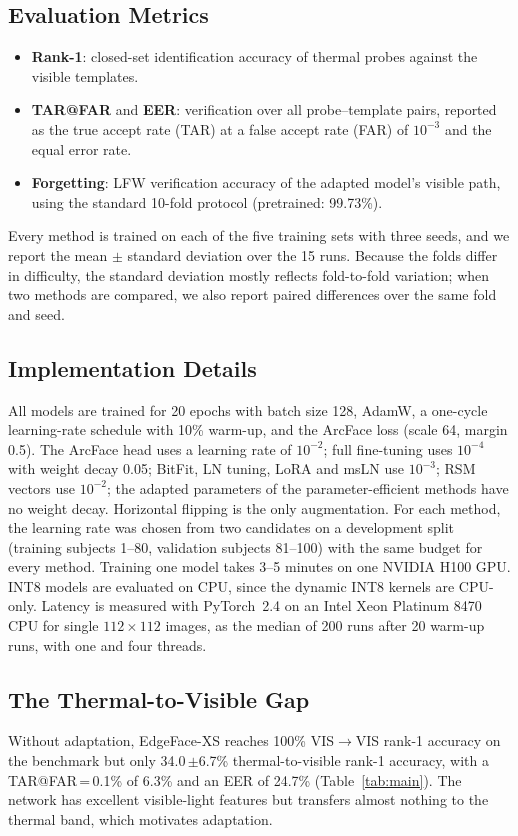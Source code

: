 \documentclass[journal]{IEEEtran}
\newcommand{\pmstd}[2]{#1\,{\scriptsize$\pm$#2}}
\begin{document}
\subsection{Evaluation Metrics}
\begin{itemize}
  \item \textbf{Rank-1}: closed-set identification accuracy of thermal probes against the visible templates.
  \item \textbf{TAR@FAR} and \textbf{EER}: verification over all probe--template pairs, reported as the true accept rate (TAR) at a false accept rate (FAR) of $10^{-3}$ and the equal error rate.
  \item \textbf{Forgetting}: LFW \cite{huang2007lfw} verification accuracy of the adapted model's visible path, using the standard 10-fold protocol (pretrained: 99.73\%).
\end{itemize}
Every method is trained on each of the five training sets with three seeds, and we report the mean $\pm$ standard deviation over the 15 runs. Because the folds differ in difficulty, the standard deviation mostly reflects fold-to-fold variation; when two methods are compared, we also report paired differences over the same fold and seed.

\subsection{Implementation Details}
All models are trained for 20 epochs with batch size 128, AdamW, a one-cycle learning-rate schedule with 10\% warm-up, and the ArcFace loss \cite{deng2019arcface} (scale 64, margin 0.5). The ArcFace head uses a learning rate of $10^{-2}$; full fine-tuning uses $10^{-4}$ with weight decay 0.05; BitFit, LN tuning, LoRA and msLN use $10^{-3}$; RSM vectors use $10^{-2}$; the adapted parameters of the parameter-efficient methods have no weight decay. Horizontal flipping is the only augmentation. For each method, the learning rate was chosen from two candidates on a development split (training subjects 1--80, validation subjects 81--100) with the same budget for every method. Training one model takes 3--5 minutes on one NVIDIA H100 GPU. INT8 models are evaluated on CPU, since the dynamic INT8 kernels are CPU-only. Latency is measured with PyTorch~2.4 on an Intel Xeon Platinum 8470 CPU for single $112\times112$ images, as the median of 200 runs after 20 warm-up runs, with one and four threads.

\subsection{The Thermal-to-Visible Gap}
Without adaptation, EdgeFace-XS reaches 100\% VIS$\to$VIS rank-1 accuracy on the benchmark but only \pmstd{34.0}{6.7}\% thermal-to-visible rank-1 accuracy, with a TAR@FAR\,=\,0.1\% of 6.3\% and an EER of 24.7\% (Table~\ref{tab:main}). The network has excellent visible-light features but transfers almost nothing to the thermal band, which motivates adaptation.
\end{document}
